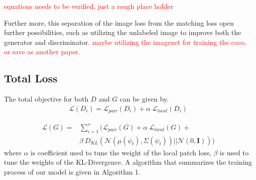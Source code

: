 \documentclass[10pt,twocolumn,letterpaper]{article}
\begin{document}
\textcolor{red}{equations needs to be verified, just a rough place holder}

Further more, this separation of the image loss from the matching loss open further possibilities, such as utilizing the unlabeled image to improve both the generator and discriminator. \textcolor{red}{maybe utilizing the imagenet for training the coco, or save as another paper.}


\subsection{Total Loss}
The total objective for both $D$ and $G$ can be given by. 
\begin{equation}
\label{equ:totalD}
\begin{split}
\mathcal{L}(D_i)  =  \mathcal{L}_{pair}(D_i) + \alpha~\mathcal{L}_{local}(D_i) 
\end{split}
\end{equation}

\begin{equation}
\label{equ:totalG}
\begin{split}
\mathcal{L}(G)  = & \sum_{i=1}^{s} ( \mathcal{L}_{pair}(G) + \alpha~\mathcal{L}_{local}(G) + \\
                  & \beta~D_{KL}(\mathcal{N}(\mu(\psi_t), \Sigma(\psi_t) )|| \mathcal{N}(0, \bm{I})) )  
\end{split}
\end{equation}
where $\alpha$ is coefficient used to tune the weight of the local patch loss, $\beta$ is used to tune the weights of the KL-Divergence.  A algorithm that summarizes the training process of our model is given in Algorithm 1.

%
\end{document}
